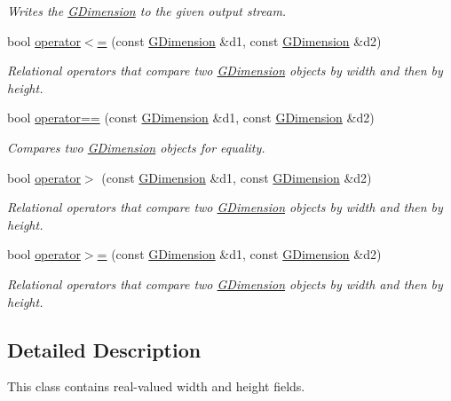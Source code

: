 \begin{DoxyCompactItemize}
\begin{DoxyCompactList}\small\item\em Writes the \mbox{\hyperlink{classGDimension}{G\+Dimension}} to the given output stream. \end{DoxyCompactList}\item 
bool \mbox{\hyperlink{classGDimension_af6f17bbe9041aee1572fc7be059bec62}{operator$<$=}} (const \mbox{\hyperlink{classGDimension}{G\+Dimension}} \&d1, const \mbox{\hyperlink{classGDimension}{G\+Dimension}} \&d2)
\begin{DoxyCompactList}\small\item\em Relational operators that compare two \mbox{\hyperlink{classGDimension}{G\+Dimension}} objects by width and then by height. \end{DoxyCompactList}\item 
bool \mbox{\hyperlink{classGDimension_a6bdb9d07a69c8f061d887e6f24750640}{operator==}} (const \mbox{\hyperlink{classGDimension}{G\+Dimension}} \&d1, const \mbox{\hyperlink{classGDimension}{G\+Dimension}} \&d2)
\begin{DoxyCompactList}\small\item\em Compares two \mbox{\hyperlink{classGDimension}{G\+Dimension}} objects for equality. \end{DoxyCompactList}\item 
bool \mbox{\hyperlink{classGDimension_a9a2ff65ec3535534d2087f7a29ddf1e8}{operator$>$}} (const \mbox{\hyperlink{classGDimension}{G\+Dimension}} \&d1, const \mbox{\hyperlink{classGDimension}{G\+Dimension}} \&d2)
\begin{DoxyCompactList}\small\item\em Relational operators that compare two \mbox{\hyperlink{classGDimension}{G\+Dimension}} objects by width and then by height. \end{DoxyCompactList}\item 
bool \mbox{\hyperlink{classGDimension_a52915605adf1b94cbc876aa6b819b70d}{operator$>$=}} (const \mbox{\hyperlink{classGDimension}{G\+Dimension}} \&d1, const \mbox{\hyperlink{classGDimension}{G\+Dimension}} \&d2)
\begin{DoxyCompactList}\small\item\em Relational operators that compare two \mbox{\hyperlink{classGDimension}{G\+Dimension}} objects by width and then by height. \end{DoxyCompactList}\end{DoxyCompactItemize}


\subsection{Detailed Description}
This class contains real-\/valued width and height fields. 

